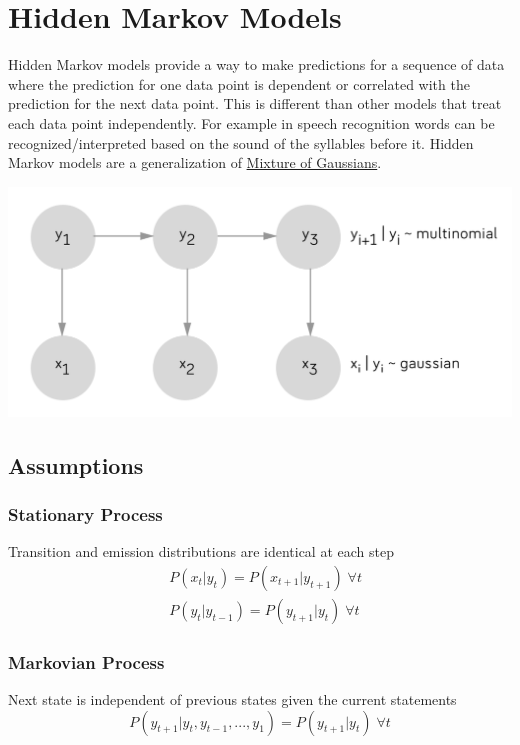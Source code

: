 \documentclass[12pt]{article}
\begin{document}
\section{Hidden Markov Models}
    Hidden Markov models provide a way to make predictions for a sequence of data where the prediction for one data
    point is dependent or correlated with the prediction for the next data point. This is different than other models
    that treat each data point independently. For example in speech recognition words can be recognized/interpreted based on the
    sound of the syllables before it. Hidden Markov models are a generalization of
    \hyperref[sec:MixtureOfGaussian]{Mixture of Gaussians}.

    \begin{center}
        \includegraphics[scale=0.3]{HMM}
    \end{center}

    \subsection{Assumptions} 
        \subsubsection{Stationary Process}
            Transition and emission distributions are identical at each step
            \begin{align*}
                & P(x_t|y_t) = P(x_{t+1}|y_{t+1}) \; \forall t \\
                & P(y_t|y_{t-1}) = P(y_{t+1}|y_{t}) \; \forall t
            \end{align*}
        
        \subsubsection{Markovian Process}
            Next state is independent of previous states given the current statements
            $$ P(y_{t+1}|y_{t}, y_{t-1},...,y_{1}) = P(y_{t+1}|y_{t}) \; \forall t $$
        
\end{document}
